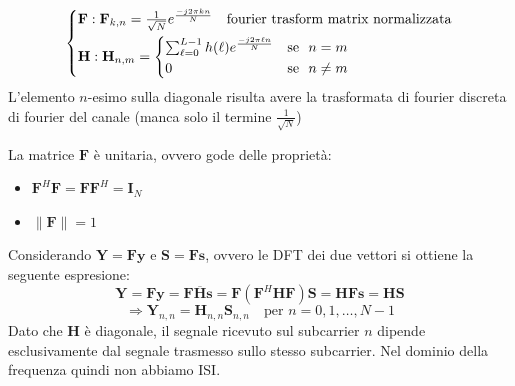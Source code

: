 \[
    \begin{cases*}
        \mathbf{F}: \mathbf{F}_{k, n} = \frac{1}{\sqrt{N}} e^{\frac{-j2\pi kn}{N}} \quad \text{fourier trasform matrix normalizzata} \\
        \mathbf{H}: \mathbf{H}_{n, m} = \begin{cases*}
                                                        \sum_{\ell=0}^{L-1} h(\ell) e^{\frac{-j2\pi \ell n}{N}} & \text{se } $n = m$ \\
                                                        0 & \text{se } $n \neq m$
                                                    \end{cases*}
    \end{cases*}
\]
L'elemento $n$-esimo sulla diagonale risulta avere la trasformata di fourier discreta di fourier del canale (manca solo il termine $\frac{1}{\sqrt{N}}$)


La matrice $\mathbf{F}$ è unitaria, ovvero gode delle proprietà:
\begin{itemize}
    \item $\mathbf{F}^H \mathbf{F} = \mathbf{F} \mathbf{F}^H = \mathbf{I}_N$
    \item $\| \mathbf{F} \| = 1$ 
\end{itemize}

Considerando $\mathbf{Y} = \mathbf{F} \mathbf{y}$ e $\mathbf{S} = \mathbf{F} \mathbf{s}$, ovvero le DFT dei due vettori si ottiene la seguente espresione:
\[
    \mathbf{Y} = \mathbf{F} \mathbf{y} = \mathbf{F} \mathbf{\overline{H}} \mathbf{s} = \mathbf{F} \left(\mathbf{F}^H \mathbf{H} \mathbf{F}\right)\mathbf{S} =  \mathbf{H} \mathbf{F} \mathbf{s} = \mathbf{H} \mathbf{S}
\]
\[
    \Rightarrow \mathbf{Y}_{n,n} = \mathbf{H}_{n,n} \mathbf{S}_{n,n} \quad \text{per } n = 0, 1, \ldots, N-1
\]
Dato che $\mathbf{H}$ è diagonale, il segnale ricevuto sul subcarrier $n$ dipende esclusivamente dal segnale trasmesso sullo stesso subcarrier. Nel dominio della frequenza quindi non abbiamo ISI.


